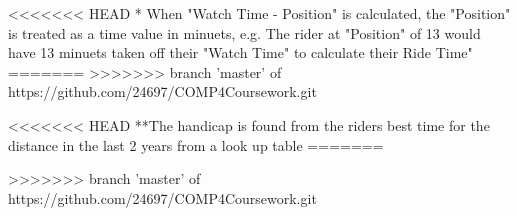 <<<<<<< HEAD
* When "Watch Time - Position" is calculated, the "Position" is treated as a time value in minuets, e.g. The rider at "Position" of 13 would have 13 minuets taken off their "Watch Time" to calculate their Ride Time"
=======
>>>>>>> branch 'master' of https://github.com/24697/COMP4Coursework.git

\begin{algorithm}[H]
\label{fig:Time Sort Algorithm}
	\caption{$Time Sort Algorithm$}
\begin{algorithmic}[2]
		\EndIf
	\EndFor
\EndWhile
\end{algorithmic}
\end{algorithm}

\begin{algorithm}[H]
\label{fig:Handicap Time Algorithm}
	\caption{$Handicap Time Algorithm$}
\begin{algorithmic}[3]
\end{algorithmic}
\end{algorithm}

<<<<<<< HEAD
**The handicap is found from the riders best time for the distance in the last 2 years from a look up table
=======
\begin{algorithm}
\label{fig:Points Awarding Algorithm}
	\caption{$Points Awarding Algorithm$}
\begin{algorithmic}
			\Else
			\EndIf
		\EndWhile
	\EndIf
		\EndFor
		\textbf{}
	\Else
	\EndIf
\EndFor
\end{algorithmic}
\end{algorithm}
>>>>>>> branch 'master' of https://github.com/24697/COMP4Coursework.git
